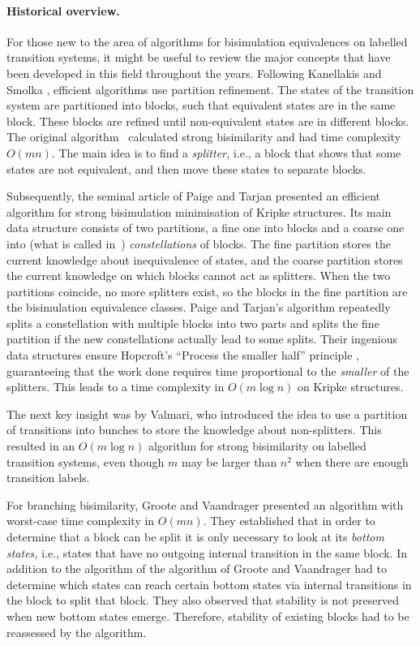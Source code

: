 \documentclass[a4paper,10pt]{article}
\theoremstyle{definition}
\theoremstyle{plain}
\newcommand{\bigo}[1]{{O\!\left(#1\right)}}
\begin{document}
\paragraph{Historical overview.}
For those new to the area of algorithms for bisimulation equivalences on labelled transition systems, it might be useful
to review the major concepts that have been developed in this field throughout the years.
Following Kanellakis and Smolka \cite{KanellakisSmolka1983},
efficient algorithms use partition refinement.
The states of the transition system are partitioned into blocks,
such that equivalent states are in the same block.
These blocks are refined until non-equivalent states are in different blocks.
The original algorithm~\cite{KanellakisSmolka1983} calculated
strong bisimilarity and had time complexity $\bigo{mn}$.
The main idea is to find a \textit{splitter,}
i.e., a block that shows that some states are not equivalent,
and then move these states to separate blocks.

Subsequently,
the seminal article of Paige and Tarjan \cite{PT87} presented an efficient algorithm for strong bisimulation minimisation of Kripke structures.
Its main data structure consists of two partitions, a fine one into blocks and a coarse one into
(what is called in~\cite{GJKW2017}) \textit{constellations} of blocks.
The fine partition stores the current knowledge about inequivalence of states,
and the coarse partition stores the current knowledge on which blocks cannot act as splitters.
When the two partitions coincide, no more splitters exist,
so the blocks in the fine partition are the bisimulation equivalence classes.
Paige and Tarjan's algorithm repeatedly splits a constellation with multiple blocks into two parts
and splits the fine partition if the new constellations actually lead to some splits.
Their ingenious data structures ensure Hopcroft's ``Process the smaller half'' principle \cite{Hop1971}, guaranteeing
that the work done requires time proportional to the \textit{smaller} of the splitters.
This leads to a time complexity in $\bigo{m \log n}$ on Kripke structures.

The next key insight was by Valmari,
who introduced the idea to use a partition of transitions into bunches \cite{Valmari2009}
to store the knowledge about non-splitters.
This resulted in an $\bigo{m \log n}$ algorithm for strong bisimilarity on labelled transition systems,
even though $m$ may be larger than $n^2$ when there are enough transition labels.

For branching bisimilarity,
Groote and Vaandrager \cite{GV90} presented an algorithm with worst-case time complexity in $\bigo{mn}$.
They established that in order to determine that a block can be split it is only necessary to look
at its \textit{bottom states,} i.e., states that have no outgoing internal transition in the same block.
In addition to the algorithm of \cite{KanellakisSmolka1983} the algorithm of Groote and Vaandrager \cite{GV90}
had to determine which states can reach certain bottom states via internal transitions in the block to split that block.
They also observed that stability is not preserved
when new bottom states emerge. Therefore, stability of existing blocks had to be reassessed
by the algorithm.
\end{document}
